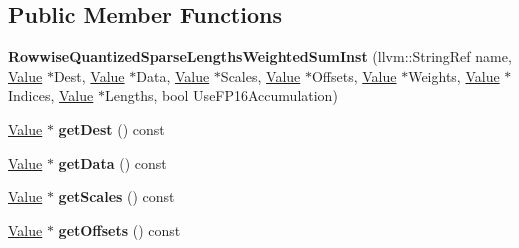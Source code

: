 \subsection*{Public Member Functions}
\begin{DoxyCompactItemize}
\item 
\mbox{\label{classglow_1_1_rowwise_quantized_sparse_lengths_weighted_sum_inst_a669648acec6d70a03ec877650dffd9d1}} 
{\bfseries Rowwise\+Quantized\+Sparse\+Lengths\+Weighted\+Sum\+Inst} (llvm\+::\+String\+Ref name, \hyperlink{classglow_1_1_value}{Value} $\ast$Dest, \hyperlink{classglow_1_1_value}{Value} $\ast$Data, \hyperlink{classglow_1_1_value}{Value} $\ast$Scales, \hyperlink{classglow_1_1_value}{Value} $\ast$Offsets, \hyperlink{classglow_1_1_value}{Value} $\ast$Weights, \hyperlink{classglow_1_1_value}{Value} $\ast$Indices, \hyperlink{classglow_1_1_value}{Value} $\ast$Lengths, bool Use\+F\+P16\+Accumulation)
\item 
\mbox{\label{classglow_1_1_rowwise_quantized_sparse_lengths_weighted_sum_inst_a28cb84ecbfb22b36dd03a710227659a9}} 
\hyperlink{classglow_1_1_value}{Value} $\ast$ {\bfseries get\+Dest} () const
\item 
\mbox{\label{classglow_1_1_rowwise_quantized_sparse_lengths_weighted_sum_inst_a921d55ee648dda2409e57a57ca729fb2}} 
\hyperlink{classglow_1_1_value}{Value} $\ast$ {\bfseries get\+Data} () const
\item 
\mbox{\label{classglow_1_1_rowwise_quantized_sparse_lengths_weighted_sum_inst_a89f86db4db6752c2402f5b3dbfdfa24c}} 
\hyperlink{classglow_1_1_value}{Value} $\ast$ {\bfseries get\+Scales} () const
\item 
\mbox{\label{classglow_1_1_rowwise_quantized_sparse_lengths_weighted_sum_inst_a7f14b7edcab25a48c055a6603dded364}} 
\hyperlink{classglow_1_1_value}{Value} $\ast$ {\bfseries get\+Offsets} () const
\item 
\mbox{\label{classglow_1_1_rowwise_quantized_sparse_lengths_weighted_sum_inst_a12f800f20c444ef526cc3cc87719dbb3}} 

\end{DoxyCompactItemize}
